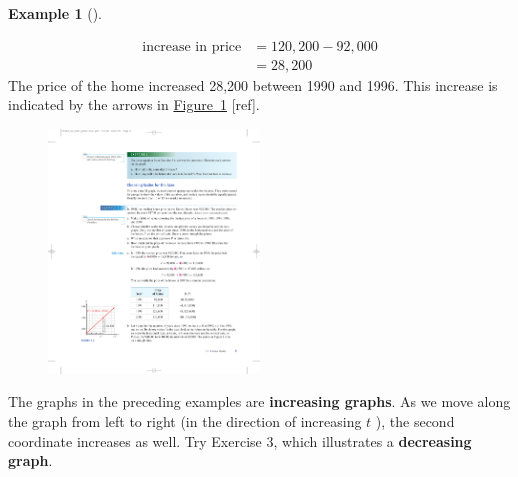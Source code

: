 \documentclass[10pt,]{book}
\newcommand{\terminology}[1]{\textbf{#1}}
\theoremstyle{plain}
\theoremstyle{definition}
\theoremstyle{definition}
\newtheorem{example}[theorem]{Example}
\theoremstyle{definition}
\theoremstyle{definition}
\numberwithin{equation}{section}
\newcommand{\amp}{ & }
\begin{document}
\begin{example}[]
\begin{enumerate}[label=*\alph**]
            \begin{align*}
\text{increase in price}\amp=120,200-92,000
                \\
\amp=28,200
\end{align*}  
            The price of the home increased \textdollar{}28,200 between 1990 and 1996.  This increase is indicated by the arrows in \hyperref[fig-median-house]{Figure~\ref{fig-median-house}} [ref].%
\leavevmode%
\begin{figure}
\centering
\includegraphics[width=0.50\textwidth,]{images/fig1-3.pdf}\caption{\label{fig-median-house}}
\end{figure}
\end{enumerate}
\end{example}
\par
The graphs in the preceding examples are \terminology{increasing graphs}.  As we move along the graph from left to right (in the direction of increasing \(t\) ), the second coordinate increases as well.  Try Exercise 3, which illustrates a \terminology{decreasing graph}.%
\end{document}
